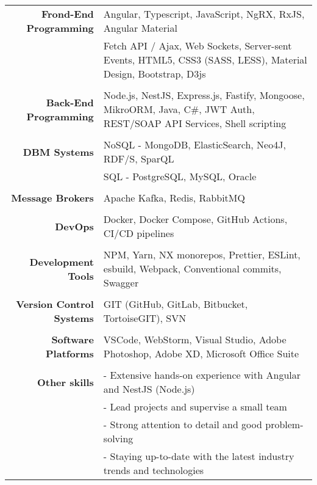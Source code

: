 \documentclass[11pt]{article}
\begin{document}
\begin{longtable}{rp{12cm}}

\textbf{Frond-End Programming} 
& Angular, Typescript, JavaScript, NgRX, RxJS, Angular Material \\
& Fetch API / Ajax, Web Sockets, Server-sent Events, HTML5, CSS3 (SASS, LESS), Material Design, Bootstrap, D3js \\

\multicolumn{2}{c}{} \\
\textbf{Back-End Programming} 
& Node.js, NestJS, Express.js, Fastify, Mongoose, MikroORM, Java, C\#, JWT Auth, REST/SOAP API Services, Shell scripting \\

\multicolumn{2}{c}{} \\
\textbf{DBM Systems} 
& NoSQL - MongoDB, ElasticSearch, Neo4J, RDF/S, SparQL \\
& SQL - PostgreSQL, MySQL, Oracle  \\

\multicolumn{2}{c}{} \\
\textbf{Message Brokers} 
& Apache Kafka, Redis, RabbitMQ \\

\multicolumn{2}{c}{} \\
\textbf{DevOps} 
& Docker, Docker Compose, GitHub Actions, CI/CD pipelines \\

\multicolumn{2}{c}{} \\
\textbf{Development Tools} 
& NPM, Yarn, NX monorepos, Prettier, ESLint, esbuild, Webpack, Conventional commits, Swagger \\

\multicolumn{2}{c}{} \\
\textbf{Version Control Systems} 
& GIT (GitHub, GitLab, Bitbucket, TortoiseGIT), SVN \\

\multicolumn{2}{c}{} \\
\textbf{Software Platforms} 
& VSCode, WebStorm, Visual Studio, Adobe Photoshop, Adobe XD, Microsoft Office Suite \\

\multicolumn{2}{c}{} \\
\textbf{Other skills} 
& - Extensive hands-on experience with Angular and NestJS (Node.js) \\
& - Lead projects and supervise a small team \\
& - Strong attention to detail and good problem-solving \\
& - Staying up-to-date with the latest industry trends and technologies \\



\end{longtable}
\end{document}
